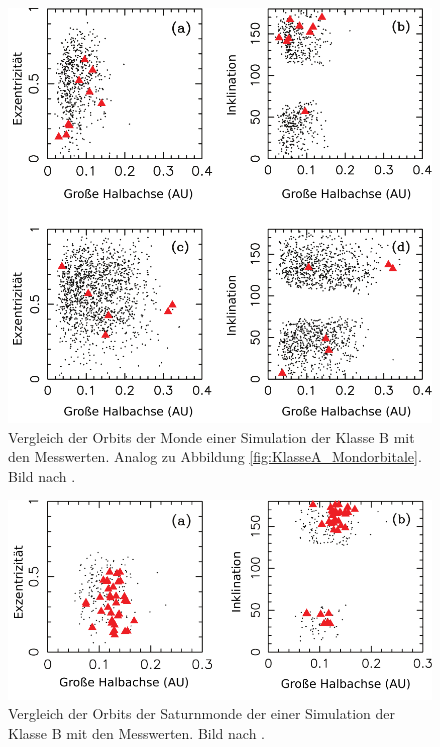 \documentclass[12pt,a4paper,twoside]{article}
\renewcommand{\cite}{\citep}
\begin{document}
\begin{figure}[tbn]
\centering
\includegraphics[scale=0.7]{img/Nesvorny2007-5}
\caption{Vergleich der Orbits der Monde einer Simulation der Klasse B mit den Messwerten. Analog zu Abbildung \ref{fig:KlasseA_Mondorbitale}. Bild nach \cite{Nesvorny2007}.} 
\label{fig:KlasseB_Mondorbitale}
\end{figure}

\begin{figure}[tbn] %
\centering
\includegraphics[scale=0.7]{img/Nesvorny2007-6ab}
\caption{Vergleich der Orbits der Saturnmonde der einer Simulation der Klasse B mit den Messwerten. Bild nach \cite{Nesvorny2007}.} 
\label{fig:Saturnmondorbitale}
\end{figure}
\end{document}
